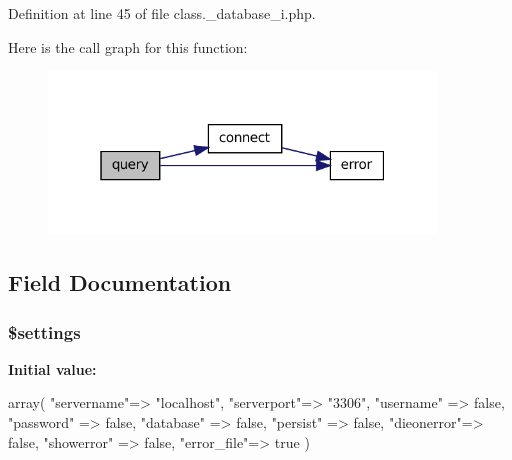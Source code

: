 Definition at line 45 of file class.\_\-database\_\-i.php.








Here is the call graph for this function:\nopagebreak
\begin{figure}[H]
\begin{center}
\leavevmode
\includegraphics[width=292pt]{class__database_a6b251c8058230359b2922377699c4f29_cgraph}
\end{center}
\end{figure}




\subsection{Field Documentation}
\hypertarget{class__database_ac7c3353107070daa85f641882931b358}{
\subsubsection[{\$settings}]{\setlength{\rightskip}{0pt plus 5cm}\$settings}}
\label{class__database_ac7c3353107070daa85f641882931b358}
{\bfseries Initial value:}
\begin{DoxyCode}
 array(
            "servername"=> "localhost",
            "serverport"=> "3306",
            "username"  => false,
            "password"  => false,
            "database"  => false,
            "persist"   => false,
            "dieonerror"=> false,
            "showerror" => false,
            "error_file"=> true
        )
\end{DoxyCode}


